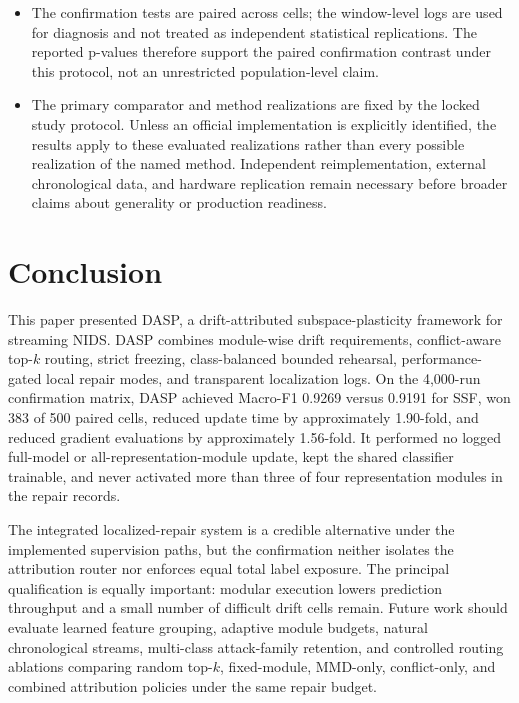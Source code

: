 \documentclass{ieeeaccess}
\begin{document}
\begin{itemize}
    \item The confirmation tests are paired across cells; the window-level logs are used for diagnosis and not treated as independent statistical replications. The reported p-values therefore support the paired confirmation contrast under this protocol, not an unrestricted population-level claim.
\item The primary comparator and method realizations are fixed by the locked study protocol. Unless an official implementation is explicitly identified, the results apply to these evaluated realizations rather than every possible realization of the named method. Independent reimplementation, external chronological data, and hardware replication remain necessary before broader claims about generality or production readiness.
\end{itemize}

\section{Conclusion}
\label{sec:conclusion}

This paper presented DASP, a drift-attributed subspace-plasticity framework for streaming NIDS. DASP combines module-wise drift requirements, conflict-aware top-$k$ routing, strict freezing, class-balanced bounded rehearsal, performance-gated local repair modes, and transparent localization logs. On the 4,000-run confirmation matrix, DASP achieved Macro-F1 0.9269 versus 0.9191 for SSF, won 383 of 500 paired cells, reduced update time by approximately 1.90-fold, and reduced gradient evaluations by approximately 1.56-fold. It performed no logged full-model or all-representation-module update, kept the shared classifier trainable, and never activated more than three of four representation modules in the repair records.

The integrated localized-repair system is a credible alternative under the implemented supervision paths, but the confirmation neither isolates the attribution router nor enforces equal total label exposure. The principal qualification is equally important: modular execution lowers prediction throughput and a small number of difficult drift cells remain. Future work should evaluate learned feature grouping, adaptive module budgets, natural chronological streams, multi-class attack-family retention, and controlled routing ablations comparing random top-$k$, fixed-module, MMD-only, conflict-only, and combined attribution policies under the same repair budget.
\end{document}
